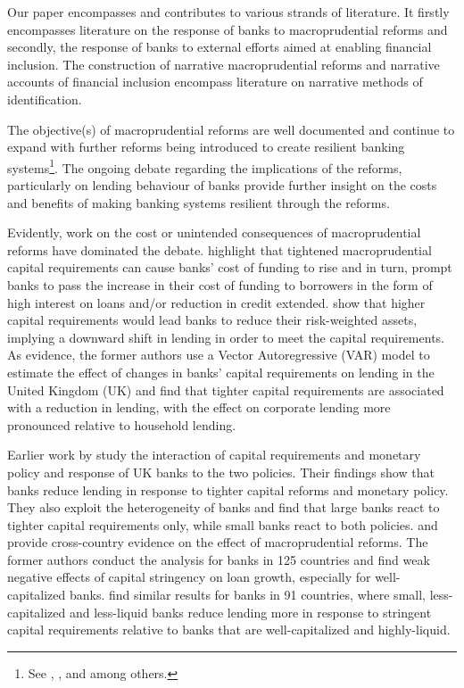\documentclass[
  letterpaper,
  DIV=11,
  numbers=noendperiod]{scrartcl}
\begin{document}
Our paper encompasses and contributes to various strands of literature.
It firstly encompasses literature on the response of banks to
macroprudential reforms and secondly, the response of banks to external
efforts aimed at enabling financial inclusion. The construction of
narrative macroprudential reforms and narrative accounts of financial
inclusion encompass literature on narrative methods of identification.

The objective(s) of macroprudential reforms are well documented and
continue to expand with further reforms being introduced to create
resilient banking
systems\footnote{See \cite{kashyap2004cyclical}, \cite{basel06}, \cite{cohen2016banks} and \cite{cerutti2018changes} among others.}.
The ongoing debate regarding the implications of the reforms,
particularly on lending behaviour of banks provide further insight on
the costs and benefits of making banking systems resilient through the
reforms.

Evidently, work on the cost or unintended consequences of
macroprudential reforms have dominated the debate.
\cite{noss2016estimating} highlight that tightened macroprudential
capital requirements can cause banks' cost of funding to rise and in
turn, prompt banks to pass the increase in their cost of funding to
borrowers in the form of high interest on loans and/or reduction in
credit extended. \cite{deli2017real} show that higher capital
requirements would lead banks to reduce their risk-weighted assets,
implying a downward shift in lending in order to meet the capital
requirements. As evidence, the former authors use a Vector
Autoregressive (VAR) model to estimate the effect of changes in banks'
capital requirements on lending in the United Kingdom (UK) and find that
tighter capital requirements are associated with a reduction in lending,
with the effect on corporate lending more pronounced relative to
household lending.

Earlier work by \cite{aiyar2016does} study the interaction of capital
requirements and monetary policy and response of UK banks to the two
policies. Their findings show that banks reduce lending in response to
tighter capital reforms and monetary policy. They also exploit the
heterogeneity of banks and find that large banks react to tighter
capital requirements only, while small banks react to both policies.
\cite{deli2017real} and \cite{mirzaei2022effectiveness} provide
cross-country evidence on the effect of macroprudential reforms. The
former authors conduct the analysis for banks in 125 countries and find
weak negative effects of capital stringency on loan growth, especially
for well-capitalized banks. \cite{mirzaei2022effectiveness} find similar
results for banks in 91 countries, where small, less-capitalized and
less-liquid banks reduce lending more in response to stringent capital
requirements relative to banks that are well-capitalized and
highly-liquid.
\end{document}
